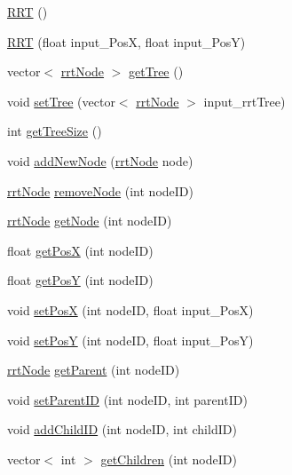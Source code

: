 \begin{DoxyCompactItemize}
\item 
\hyperlink{classRRT_a0a7bb3a3af2d70c656764fbe8f6ae671}{R\-R\-T} ()
\item 
\hyperlink{classRRT_a09ca68517ff0379f90b7c549136fc5eb}{R\-R\-T} (float input\-\_\-\-Pos\-X, float input\-\_\-\-Pos\-Y)
\item 
vector$<$ \hyperlink{structRRT_1_1rrtNode}{rrt\-Node} $>$ \hyperlink{classRRT_a45db97004bbd467c8747f67039b84874}{get\-Tree} ()
\item 
void \hyperlink{classRRT_aa87cbb894114472098a8081e05546537}{set\-Tree} (vector$<$ \hyperlink{structRRT_1_1rrtNode}{rrt\-Node} $>$ input\-\_\-rrt\-Tree)
\item 
int \hyperlink{classRRT_a05dc852e0b777042e290dcc96bf605bb}{get\-Tree\-Size} ()
\item 
void \hyperlink{classRRT_a5a0591369964c82b95f08c9f868dbd54}{add\-New\-Node} (\hyperlink{structRRT_1_1rrtNode}{rrt\-Node} node)
\item 
\hyperlink{structRRT_1_1rrtNode}{rrt\-Node} \hyperlink{classRRT_a480c7bcf17aef6c0d406829e16ec24c6}{remove\-Node} (int node\-I\-D)
\item 
\hyperlink{structRRT_1_1rrtNode}{rrt\-Node} \hyperlink{classRRT_afde36442771a9552bb97572098396c2b}{get\-Node} (int node\-I\-D)
\item 
float \hyperlink{classRRT_a54760030f6b61b258b6eec4472ced906}{get\-Pos\-X} (int node\-I\-D)
\item 
float \hyperlink{classRRT_a499a6d42d47b76c306a80573cba0a555}{get\-Pos\-Y} (int node\-I\-D)
\item 
void \hyperlink{classRRT_af97e1958775e9dcaedaddaae6701d176}{set\-Pos\-X} (int node\-I\-D, float input\-\_\-\-Pos\-X)
\item 
void \hyperlink{classRRT_ad83a4a28dadc2f1c396364af356871c7}{set\-Pos\-Y} (int node\-I\-D, float input\-\_\-\-Pos\-Y)
\item 
\hyperlink{structRRT_1_1rrtNode}{rrt\-Node} \hyperlink{classRRT_ae781d9ea50b05718fb1e1f26e375f5f8}{get\-Parent} (int node\-I\-D)
\item 
void \hyperlink{classRRT_a8abb3cac74e30a830c01478ded18dc50}{set\-Parent\-I\-D} (int node\-I\-D, int parent\-I\-D)
\item 
void \hyperlink{classRRT_a2754f5aa8d9c4e725a0c4c2d73576bd9}{add\-Child\-I\-D} (int node\-I\-D, int child\-I\-D)
\item 
vector$<$ int $>$ \hyperlink{classRRT_a5a873a31d26a94d60ff9359dcc0cda3f}{get\-Children} (int node\-I\-D)

\end{DoxyCompactItemize}
